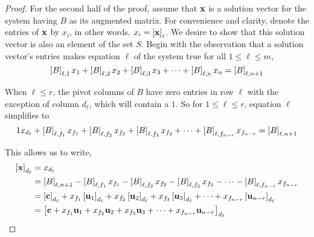 \documentclass{ximera}
\begin{document}
\begin{theorem}
\begin{proof}
    For the second half of the proof, assume that $\mathbf{x}$ is a
    solution vector for the system having $B$ as its augmented matrix.
    For convenience and clarity, denote the entries of $\mathbf{x}$ by
    $x_i$, in other words, $x_i=\left\lbrack\mathbf{x}\right\rbrack_{i}$.  We desire
    to show that this solution vector is also an element of the set
    $S$.  Begin with the observation that a solution vector's entries
    makes equation $\ell$ of the system true for all
    $1\leq\ell\leq m$,
    \[
      \left\lbrack B\right\rbrack_{\ell,1}x_1+
      \left\lbrack B\right\rbrack_{\ell,2}x_2+
      \left\lbrack B\right\rbrack_{\ell,3}x_3+
      \cdots+
      \left\lbrack B\right\rbrack_{\ell,n}x_n=
      \left\lbrack B\right\rbrack_{\ell,n+1}
    \]
    
    When $\ell\leq r$, the pivot columns of $B$ have zero entries in row $\ell$ with the exception of column $d_\ell$, which will contain a $1$.  So for $1\leq\ell\leq r$, equation $\ell$ simplifies to
    \[
      1x_{d_\ell}+
      \left\lbrack B\right\rbrack_{\ell,f_1}x_{f_1}+
      \left\lbrack B\right\rbrack_{\ell,f_2}x_{f_2}+
      \left\lbrack B\right\rbrack_{\ell,f_3}x_{f_3}+
      \cdots+
      \left\lbrack B\right\rbrack_{\ell,f_{n-r}}x_{f_{n-r}}=
      \left\lbrack B\right\rbrack_{\ell,n+1}
    \]
    
    This allows us to write,
    \begin{align*}
      \left\lbrack\mathbf{x}\right\rbrack_{d_\ell}
      &=
        x_{d_\ell}\\
      &=
        \left\lbrack B\right\rbrack_{\ell,n+1}
        -\left\lbrack B\right\rbrack_{\ell,f_1}x_{f_1}
        -\left\lbrack B\right\rbrack_{\ell,f_2}x_{f_2}
        -\left\lbrack B\right\rbrack_{\ell,f_3}x_{f_3}
        -\cdots
        -\left\lbrack B\right\rbrack_{\ell,f_{n-r}}x_{f_{n-r}}\\
      &=
        \left\lbrack\mathbf{c}\right\rbrack_{d_\ell}
        +x_{f_1}\left\lbrack\mathbf{u}_1\right\rbrack_{d_\ell}
        +x_{f_2}\left\lbrack\mathbf{u}_2\right\rbrack_{d_\ell}
        +x_{f_3}\left\lbrack\mathbf{u}_3\right\rbrack_{d_\ell}
        +\cdots
        +x_{f_{n-r}}\left\lbrack\mathbf{u}_{n-r}\right\rbrack_{d_\ell}\\
      &=
        \left\lbrack
        \mathbf{c}
        +x_{f_1}\mathbf{u}_1
        +x_{f_2}\mathbf{u}_2
        +x_{f_3}\mathbf{u}_3
        +\cdots
        +x_{f_{n-r}}\mathbf{u}_{n-r}
        \right\rbrack_{d_\ell}
    \end{align*}
    

\end{proof}
\end{theorem}
\end{document}
